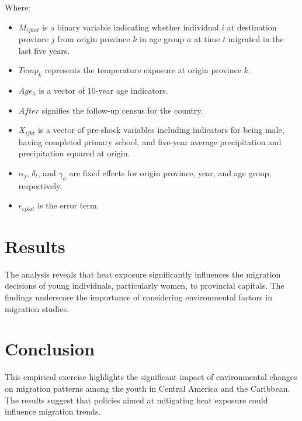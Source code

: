 \documentclass[12pt]{article}
\begin{document}
Where:
\begin{itemize}
    \item $M_{ijkat}$ is a binary variable indicating whether individual $i$ at destination province $j$ from origin province $k$ in age group $a$ at time $t$ migrated in the last five years.
    \item $Temp_k$ represents the temperature exposure at origin province $k$.
    \item $Age_a$ is a vector of 10-year age indicators.
    \item $After$ signifies the follow-up census for the country.
    \item $X_{ijkt}$ is a vector of pre-shock variables including indicators for being male, having completed primary school, and five-year average precipitation and precipitation squared at origin.
    \item $\alpha_j$, $\delta_t$, and $\gamma_a$ are fixed effects for origin province, year, and age group, respectively.
    \item $\epsilon_{ijkat}$ is the error term.
\end{itemize}

\section{Results}
The analysis reveals that heat exposure significantly influences the migration decisions of young individuals, particularly women, to provincial capitals. The findings underscore the importance of considering environmental factors in migration studies.

\section{Conclusion}
This empirical exercise highlights the significant impact of environmental changes on migration patterns among the youth in Central America and the Caribbean. The results suggest that policies aimed at mitigating heat exposure could influence migration trends.


% 
\end{document}
